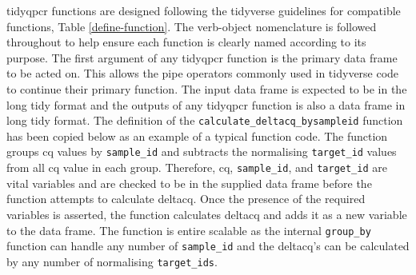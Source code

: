 \documentclass[../main.tex]{subfiles}
\begin{document}
tidyqpcr functions are designed following the tidyverse guidelines for compatible functions, Table \ref{define-function}. 
The verb-object nomenclature is followed throughout to help ensure each function is clearly named according to its purpose. 
The first argument of any tidyqpcr function is the primary data frame to be acted on. 
This allows the pipe operators commonly used in tidyverse code to continue their primary function. 
The input data frame is expected to be in the long tidy format and the outputs of any tidyqpcr function is also a data frame in long tidy format. 
The definition of the \lstinline{calculate_deltacq_bysampleid} function has been copied below as an example of a typical function code. 
The function groups cq values by \lstinline{sample_id} and subtracts the normalising \lstinline{target_id} values from all cq value in each group. 
Therefore, cq, \lstinline{sample_id}, and \lstinline{target_id} are vital variables and are checked to be in the supplied data frame before the function attempts to calculate deltacq. 
Once the presence of the required variables is asserted, the function calculates deltacq and adds it as a new variable to the data frame. 
The function is entire scalable as the internal \lstinline{group_by} function can handle any number of \lstinline{sample_id} and the deltacq's can be calculated by any number of normalising \lstinline{target_ids}.
\end{document}
